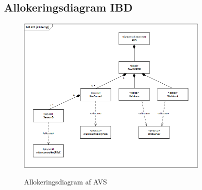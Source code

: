 \subsection{Allokeringsdiagram IBD}

\begin{figure}[H]
	\centering
	\includegraphics[width=0.82\textwidth]{Systemarkitektur/System/AVS_Allokeringsdiagram.png}
	\label{fig:System BDD}
	\caption{Allokeringsdiagram af AVS}
\end{figure}





